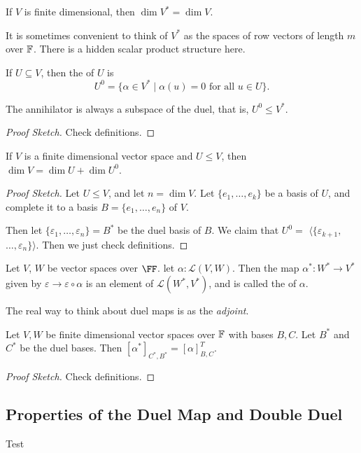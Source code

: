 \documentclass[a4paper]{scrartcl}
\begin{document}
\begin{corollary}
If $V$ is finite dimensional, then $\dim V^* = \dim V$.
\end{corollary}
\begin{remark}
    It is sometimes convenient to think of $V^*$ as the spaces of row vectors of length $m$ over $\mathbb{F}$. There is a hidden scalar product structure here.
\end{remark}

\begin{definition}[Annihilator]
    If $U \subseteq V$, then the  of $U$ is
    $$
    U^0 = \{ \alpha \in V^* \mid \alpha(u) = 0 \text{ for all }u \in U\}.
    $$
\end{definition}

\begin{lemma}
    The annihilator is always a subspace of the duel, that is, $U^0 \leq V^*$.
\end{lemma}
\begin{proof}[Proof Sketch]    
    Check definitions.
\end{proof}

\begin{lemma}
    If $V$ is a finite dimensional vector space and $U \leq V$, then $\dim V = \dim U + \dim U^0$.
\end{lemma}
\begin{proof}[Proof Sketch]
    Let $U \leq V$, and let $n = \dim V$. Let $\{e_1, \dots, e_k\}$ be a basis of $U$, and complete it to a basis $B = \{e_1, \dots, e_n\}$ of $V$.

    Then let $\{\varepsilon_1, \dots, \varepsilon_n\} = B^*$ be the duel basis of $B$.
    We claim that $U^0 =$ $\langle\{\varepsilon_{k + 1},$ $\dots, \varepsilon_{n}\} \rangle$. 
    Then we just check definitions.
\end{proof}

\begin{definition}
    Let $V$, $W$ be vector spaces over $\FF$. let $\alpha : \mathcal{L}(V, W)$. Then the map $\alpha^*: W^* \rightarrow V^*$ given by $\varepsilon \rightarrow \varepsilon \circ \alpha$ is an element of $\mathcal{L}(W^*, V^*)$, and is called the  of $\alpha$.
\end{definition}

The real way to think about duel maps is as the \emph{adjoint}.

\begin{proposition}
    Let $V, W$ be finite dimensional vector spaces over $\mathbb{F}$ with bases $B, C$. Let $B^*$ and $C^*$ be the duel bases. Then $[\alpha^*]_{C^*, B^*} = [\alpha]_{B, C}^T$.
\end{proposition}
\begin{proof}[Proof Sketch]
    Check definitions.
\end{proof}

\subsection{Properties of the Duel Map and Double Duel}

Test
\end{document}
